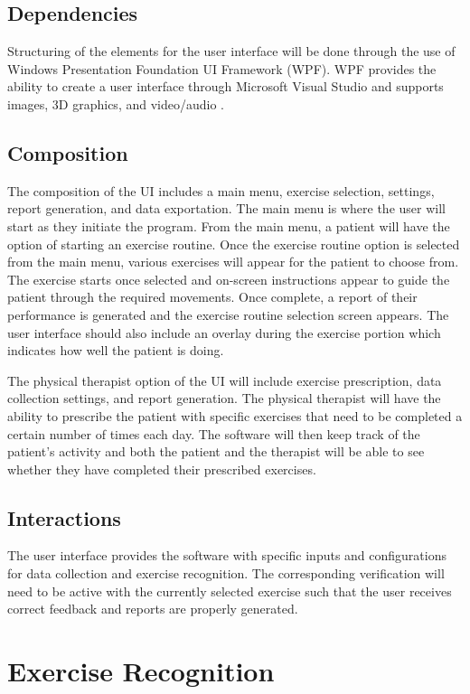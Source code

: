 \documentclass[onecolumn, draftclsnofoot,10pt, compsoc]{IEEEtran}
\begin{document}
\subsection{Dependencies}
Structuring of the elements for the user interface will be done through the use of Windows Presentation Foundation UI Framework (WPF). WPF provides the ability to create a user interface through Microsoft Visual Studio and supports images, 3D graphics, and video/audio \cite{WPFSamples}. 

\subsection{Composition}
The composition of the UI includes a main menu, exercise selection, settings, report generation, and data exportation. The main menu is where the user will start as they initiate the program. From the main menu, a patient will have the option of starting an exercise routine. Once the exercise routine option is selected from the main menu, various exercises will appear for the patient to choose from. The exercise starts once selected and on-screen instructions appear to guide the patient through the required movements. Once complete, a report of their performance is generated and the exercise routine selection screen appears. The user interface should also include an overlay during the exercise portion which indicates how well the patient is doing.

The physical therapist option of the UI will include exercise prescription, data collection settings, and report generation. The physical therapist will have the ability to prescribe the patient with specific exercises that need to be completed a certain number of times each day. The software will then keep track of the patient's activity and both the patient and the therapist will be able to see whether they have completed their prescribed exercises.

\subsection{Interactions}
The user interface provides the software with specific inputs and configurations for data collection and exercise recognition. The corresponding verification will need to be active with the currently selected exercise such that the user receives correct feedback and reports are properly generated.  

\section{Exercise Recognition}
\end{document}
